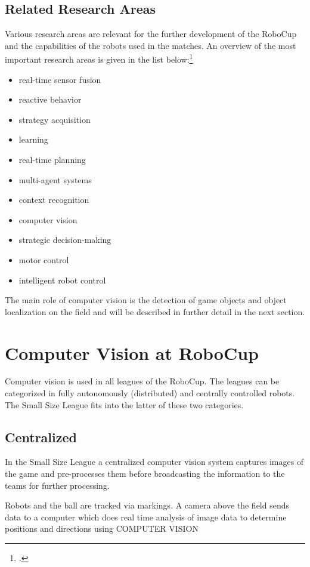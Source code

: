 \subsection{Related Research Areas \label{sec:robo-research}}
Various research areas are relevant for the further development of the RoboCup
and the capabilities of the robots used in the matches. An overview of the most
important research areas is given in the list below:\footcite[Cf.][]{robo_objectives}
\begin{itemize}
  \item real-time sensor fusion
  \item reactive behavior
  \item strategy acquisition
  \item learning
  \item real-time planning
  \item multi-agent systems
  \item context recognition
  \item computer vision
  \item strategic decision-making
  \item motor control
  \item intelligent robot control
\end{itemize}

The main role of computer vision is the detection of game objects and object
localization on the field and will be described in further detail in the next
section.

\newpage
\section{Computer Vision at RoboCup \label{sec:cv-robo}}

Computer vision is used in all leagues of the RoboCup.
The leagues can be categorized in fully autonomously (distributed) and centrally
controlled robots. The Small Size League fits into the latter of these two categories.

\subsection{Centralized}
In the Small Size League a centralized computer vision system captures images
of the game and pre-processes them before broadcasting the information to the teams
for further processing.

Robots and the ball are tracked via markings. A camera above the field sends
data to a computer which does real time analysis of image data to determine
positions and directions using COMPUTER VISION

